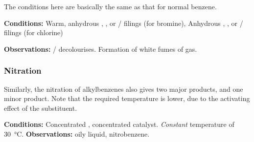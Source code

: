 				The conditions here are basically the same as that for normal benzene.

				\vspace{1.5em}
				\vbox{\textbf{Conditions:}	\tabto{35mm}Warm, anhydrous , , or  / \ch{\aluminium} filings (for bromine),
											\tabto{35mm}Anhydrous , , or
														 / \ch{\aluminium} filings (for chlorine)}

				\vspace{0.75em}
				\vbox{\textbf{Observations:}\tabto{35mm}  /   decolourises.
											\tabto{35mm}Formation of white fumes of  gas.}



			\pagebreak
			\subsubsection{Nitration}

				Similarly, the nitration of alkylbenzenes also gives two major products, and one minor product. Note that the required temperature
				is lower, due to the activating effect of the  substituent.

				\vspace{1.5em}
				\vbox{\textbf{Conditions:}	\tabto{35mm}Concentrated , concentrated  catalyst.
											\tabto{35mm}\textit{Constant} temperature of \SI{30}{\celsius}.}
				\vspace{0.75em}
				\vbox{\textbf{Observations:}\tabto{35mm} oily liquid, nitrobenzene.}



